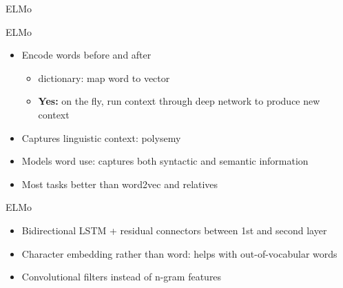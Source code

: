 \documentclass[t,aspectratio=169]{beamer}
\begin{document}
\begin{frame}{ELMo}
\end{frame}

\begin{frame}{ELMo}
  \begin{itemize}
  \item Encode words before and after 
    \begin{itemize}
    \item {} dictionary: map word to vector
    \item \textbf{Yes:} on the fly, run context through deep network to produce
      new context
    \end{itemize}
  \item Captures linguistic context: polysemy
  \item Models word use: captures both syntactic and semantic
    information
  \item Most tasks better than word2vec and relatives 
  \end{itemize}
\end{frame}

\begin{frame}{ELMo}
  \begin{itemize}
  \item Bidirectional LSTM + residual connectors between 1st and
    second layer
  \item Character embedding rather than word: helps with
    out-of-vocabular words
  \item Convolutional filters instead of n-gram features
  \end{itemize}

\end{frame}
\end{document}
